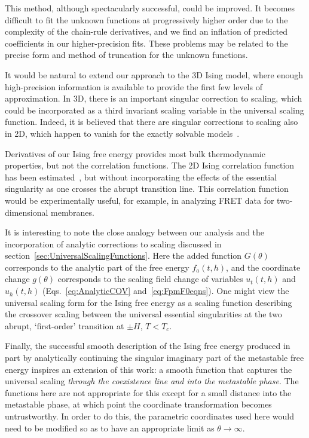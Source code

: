 \documentclass[
aps,
pre,
preprint,
longbibliography,
floatfix
]{revtex4-2}
\begin{document}
This method, although spectacularly successful, could be improved. It becomes difficult to fit the
unknown functions at progressively higher order due to the complexity of the
chain-rule derivatives, and we find an inflation of predicted coefficients in our higher-precision fits. These problems may be related to the precise form and
method of truncation for the unknown functions.

It would be natural to extend our approach to the 3D Ising model, where enough high-precision information is available to provide the first few levels of approximation. In 3D, there is an important singular correction to scaling, which could be incorporated as a third invariant scaling variable in the universal scaling function. Indeed, it is believed that there are singular corrections to scaling also in 2D, which happen to vanish for the exactly solvable models~\cite{BarmaFisherPRB}.

Derivatives of our Ising free energy provides most bulk thermodynamic properties, but not the correlation functions. The 2D Ising correlation function has been estimated~\cite{ChenPMSnn}, but without incorporating the effects of the essential singularity as one crosses the abrupt transition line. This correlation function would be experimentally useful, for example, in analyzing FRET data for two-dimensional membranes.

It is interesting to note the close analogy between our analysis and the incorporation of analytic corrections to scaling discussed in section~\ref{sec:UniversalScalingFunctions}. Here the added function $G(\theta)$ corresponds to the analytic part of the free energy $f_a(t,h)$, and the coordinate change $g(\theta)$ corresponds to the scaling field change of variables $u_t(t,h)$ and $u_h(t,h)$
(Eqs.~\ref{eq:AnalyticCOV} and~\ref{eq:FpmF0eqns}). One might view the universal scaling form for the Ising free energy as a scaling function describing the crossover scaling between the universal essential singularities at the two abrupt, `first-order' transition at $\pm H$, $T<T_c$.

Finally, the successful smooth description of the Ising free energy produced in part by
analytically continuing the singular imaginary part of the metastable free
energy inspires an extension of this work: a smooth function that captures the
universal scaling \emph{through the coexistence line and into the metastable
phase}. The functions here are not appropriate for this except for a small
distance into the metastable phase, at which point the coordinate
transformation becomes untrustworthy. In order to do this, the parametric
coordinates used here would need to be modified so as to have an appropriate
limit as $\theta\to\infty$.
\end{document}
